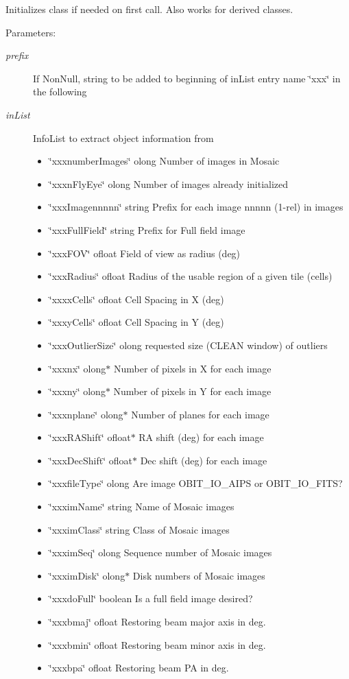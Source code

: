 Initializes class if needed on first call. Also works for derived classes. \begin{Desc}
\item[Parameters:]
\begin{description}
\item[{\em prefix}]If Non\-Null, string to be added to beginning of in\-List entry name \char`\"{}xxx\char`\"{} in the following \item[{\em in\-List}]Info\-List to extract object information from \begin{itemize}
\item \char`\"{}xxxnumber\-Images\char`\"{} olong Number of images in Mosaic \item \char`\"{}xxxn\-Fly\-Eye\char`\"{} olong Number of images already initialized \item \char`\"{}xxx\-Imagennnnn\char`\"{} string Prefix for each image nnnnn (1-rel) in images \item \char`\"{}xxx\-Full\-Field\char`\"{} string Prefix for Full field image \item \char`\"{}xxx\-FOV\char`\"{} ofloat Field of view as radius (deg) \item \char`\"{}xxx\-Radius\char`\"{} ofloat Radius of the usable region of a given tile (cells) \item \char`\"{}xxxx\-Cells\char`\"{} ofloat Cell Spacing in X (deg) \item \char`\"{}xxxy\-Cells\char`\"{} ofloat Cell Spacing in Y (deg) \item \char`\"{}xxx\-Outlier\-Size\char`\"{} olong requested size (CLEAN window) of outliers \item \char`\"{}xxxnx\char`\"{} olong$\ast$ Number of pixels in X for each image \item \char`\"{}xxxny\char`\"{} olong$\ast$ Number of pixels in Y for each image \item \char`\"{}xxxnplane\char`\"{} olong$\ast$ Number of planes for each image \item \char`\"{}xxx\-RAShift\char`\"{} ofloat$\ast$ RA shift (deg) for each image \item \char`\"{}xxx\-Dec\-Shift\char`\"{} ofloat$\ast$ Dec shift (deg) for each image \item \char`\"{}xxxfile\-Type\char`\"{} olong Are image OBIT\_\-IO\_\-AIPS or OBIT\_\-IO\_\-FITS? \item \char`\"{}xxxim\-Name\char`\"{} string Name of Mosaic images \item \char`\"{}xxxim\-Class\char`\"{} string Class of Mosaic images \item \char`\"{}xxxim\-Seq\char`\"{} olong Sequence number of Mosaic images \item \char`\"{}xxxim\-Disk\char`\"{} olong$\ast$ Disk numbers of Mosaic images \item \char`\"{}xxxdo\-Full\char`\"{} boolean Is a full field image desired? \item \char`\"{}xxxbmaj\char`\"{} ofloat Restoring beam major axis in deg. \item \char`\"{}xxxbmin\char`\"{} ofloat Restoring beam minor axis in deg. \item \char`\"{}xxxbpa\char`\"{} ofloat Restoring beam PA in deg. 
\end{itemize}
\end{description}
\end{Desc}
